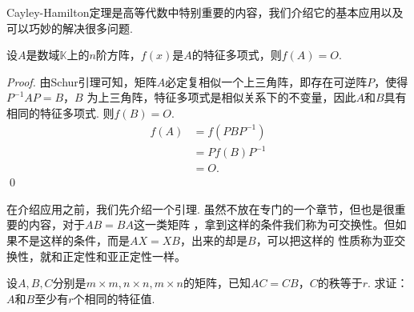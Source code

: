 Cayley-Hamilton定理是高等代数中特别重要的内容，我们介绍它的基本应用以及可以巧妙的解决很多问题.

\begin{theorem}
	设$A$是数域$\mathbb{K}$上的$n$阶方阵，$f(x)$是$A$的特征多项式，则$f(A)=O$.
\end{theorem}

\begin{proof}
	由Schur引理可知，矩阵$A$必定复相似一个上三角阵，即存在可逆阵$P$，使得$P^{-1} A P=B$，$B$
	为上三角阵，特征多项式是相似关系下的不变量，因此$A$和$B$具有相同的特征多项式. 则$f(B)=O$.
	\begin{align*}
		f(A) &= f(P B P^{-1} ) \\
		&= P f(B) P^{-1}
		\\
		&= O.
	\end{align*}  \qed{}
\end{proof}


在介绍应用之前，我们先介绍一个引理. 虽然不放在专门的一个章节，但也是很重要的内容，对于$AB=BA$这一类矩阵
，拿到这样的条件我们称为可交换性。但如果不是这样的条件，而是$AX=XB$，出来的却是$B$，可以把这样的
性质称为亚交换性，就和正定性和亚正定性一样。

\begin{proposition}
	设$A,B,C$分别是$m\times m, n\times n, m \times n$的矩阵，已知$AC=CB$，$C$的秩等于$r$.
	求证：$A$和$B$至少有$r$个相同的特征值.
\end{proposition}

